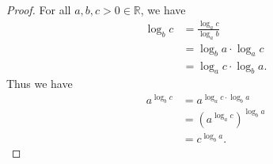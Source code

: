 \begin{proof}
  For all $a, b, c > 0 \in \mathbb{R}$, we have
  \begin{equation*}
    \begin{split}
      \log_b{c} &= \frac{\log_a{c}}{\log_a{b}} \\
      &= \log_b{a} \cdot \log_a{c} \\
      &= \log_a{c} \cdot \log_b{a}.
    \end{split}
  \end{equation*}
  Thus we have
  \begin{equation*}
    \begin{split}
      a^{\log_b{c}} &= a^{\log_a{c} \cdot \log_b{a}} \\
      &= {(a^{\log_a{c}})}^{\log_b{a}} \\
      &= c^{\log_b{a}}.
    \end{split}
  \end{equation*}
\end{proof}
